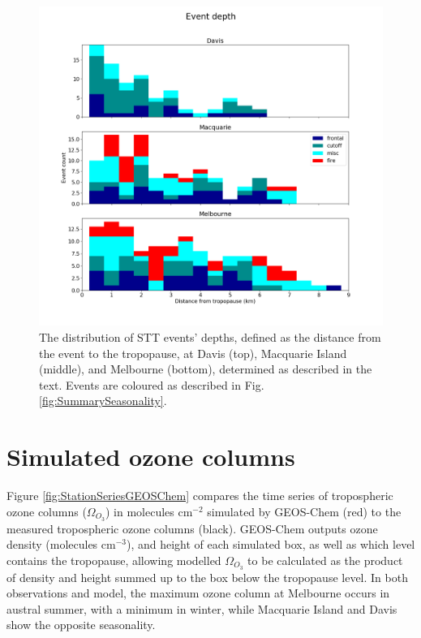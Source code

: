 \documentclass[acp, manuscript]{copernicus} %
\begin{document}
  \begin{figure}[t]
    \includegraphics[width=12cm]{figures/summary_depth.png}
    \caption{The distribution of STT events' depths, defined as the distance from the event to the tropopause, at Davis (top), Macquarie Island (middle), and Melbourne (bottom), determined as described in the text.
    Events are coloured as described in Fig. \ref{fig:SummarySeasonality}.}
    \label{fig:SummaryTPDepths}    
  \end{figure}

\section{Simulated ozone columns}
  \label{sec:ModelComparison}
  Figure \ref{fig:StationSeriesGEOSChem} compares the time series of tropospheric ozone columns ($\Omega_{O_3}$) in molecules cm$^{-2}$ simulated by GEOS-Chem (red) to the measured tropospheric ozone columns (black).
  GEOS-Chem outputs ozone density (molecules cm$^{-3}$), and height of each simulated box, as well as which level contains the tropopause, allowing modelled $\Omega_{O_3}$ to be calculated as the product of density and height summed up to the box below the tropopause level.
  In both observations and model, the maximum ozone column at Melbourne occurs in austral summer, with a minimum in winter, while Macquarie Island and Davis show the opposite seasonality.
  
\end{document}
